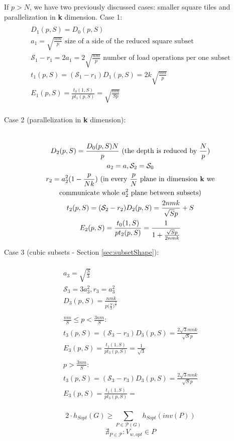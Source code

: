 \documentclass[sigplan,review,anonymous]{acmart}\settopmatter{printfolios=true,printccs=false,printacmref=false}
\begin{document}
If $p > N$, we have two previously discussed cases: smaller square tiles and 
parallelization in \textbf{k} dimension. Case 1:
\begin{multline}
\\
D_1(p,S) = D_0(p,S) \\
a_1 = \sqrt{\frac{nm}{p}} \text{ size of a side of the reduced square 
	subset} \\
\mathcal{S}_1 - r_1 = 2a_1 = 2\sqrt{\frac{nm}{p}} \text{ number of load 
	operations per one subset} \\
t_1(p,S) = (\mathcal{S}_1 - r_1) D_1(p,S) = 2k \sqrt{\frac{nm}{p}} \\
E_1(p,S) = \frac{t_0(1,S)}{p t_1(p,S)} = \sqrt{\frac{nm}{Sp}} \\
\end{multline}

Case 2 (parallelization in \textbf{k} dimension): 

\begin{multline}
\\
D_2(p,S) = \frac{D_0(p,S)N}{p} \text{ (the depth is reduced by } \frac{N}{p} 
\text{)}\\
a_2 = a , \mathcal{S}_2 = \mathcal{S}_0\\ 
r_2 = a_2^2(1 - \frac{p}{Nk}) \text{ (in every $\frac{p}{N}$ plane in dimension 
	\textbf{k} we} \\
\text{communicate whole $a_2^2$ plane between subsets)} \\
t_2(p,S) = (\mathcal{S}_2 - r_2) D_2(p,S) = \frac{2nmk}{\sqrt{S}p} + S \\
E_2(p,S) = \frac{t_0(1,S)}{p t_2(p,S)} = \frac{1}{1 + \frac{\sqrt{S}p}{2nmk}} \\
\end{multline}

Case 3 (cubic subsets - Section \ref{sec:subsetShape}):

\begin{multline}
\\
a_3 = \sqrt{\frac{S}{3}} \\ 
\mathcal{S}_3 = 3a_3^2, r_3 = a_3^2\\ 
D_3(p,S) = \frac{nmk}{p \Big(\frac{S}{3}\Big)^{\frac{3}{2}}}\\
\\
\frac{nm}{S} \le p < \frac{3nm}{S} :\\
t_3(p,S) = (\mathcal{S}_3 - r_3) D_3(p,S) = \frac{2\sqrt{3}mnk}{\sqrt{S}p} \\
E_3(p,S) = \frac{t_1(1,S)}{p t_3(p,S)} = \frac{1}{\sqrt{3}}\\
\\
p > \frac{3nm}{S} :\\
t_3(p,S) = (\mathcal{S}_3 - r_3) D_3(p,S) = \frac{2\sqrt{3}mnk}{\sqrt{S}p} \\
E_3(p,S) = \frac{t_1(1,S)}{p t_3(p,S)} = \\
\end{multline}

$$2 \cdot h_{Sopt}(G) \ge \sum_{P \in \mathcal{P}(G)} h_{Sopt}(inv(P)) $$
$$ \nexists_{P \in \mathcal{P}}: V_{w,opt} \in P $$

\end{document}
